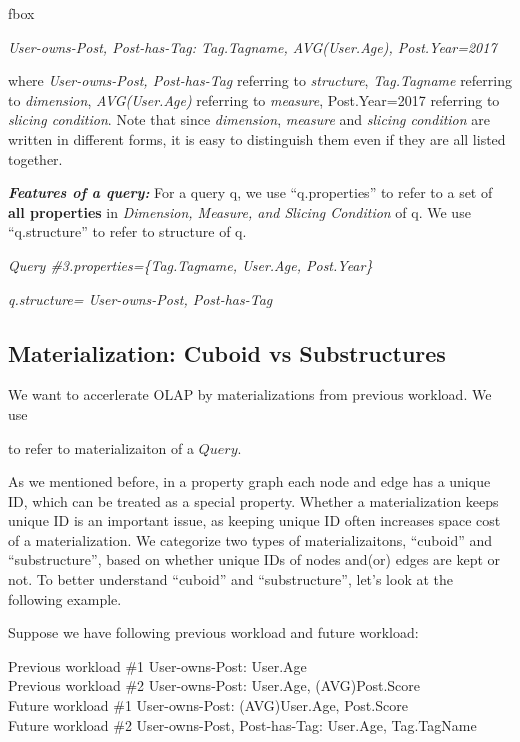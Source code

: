 fbox{
\textit{User-owns-Post, Post-has-Tag: Tag.Tagname, AVG(User.Age), Post.Year=2017
}

where \textit{User-owns-Post, Post-has-Tag} referring to  \textit{structure}, \textit{Tag.Tagname} referring to \textit{dimension},\textit{ AVG(User.Age) } referring to \textit{measure}, {Post.Year=2017} referring to \textit{slicing condition}. Note that since \textit{dimension}, \textit{measure} and \textit{slicing condition} are written in different forms, it is easy to distinguish them even if they are all listed together.


 \textbf{\textit{Features of a query:}} For a query q, we use ``q.properties'' to refer to a set of \textbf{all properties} in \textit{Dimension, Measure, and Slicing Condition} of q. We use ``q.structure'' to refer to structure of q.

 \textit{Query \#3.properties=\{Tag.Tagname, User.Age, Post.Year\}}
 
 \textit{q.structure= User-owns-Post, Post-has-Tag}



\subsection{Materialization: Cuboid vs Substructures}

We want to accerlerate OLAP by materializations from previous workload. We use


to refer to materializaiton of a $Query$.

As we mentioned before, in a property graph each node and edge has a unique ID, which can be treated as a special property. Whether a materialization keeps unique ID is an important issue, as keeping unique ID often increases space cost of a materialization. We categorize two types of materializaitons, ``cuboid'' and ``substructure'', based on whether unique IDs of nodes and(or) edges are kept or not. To better understand ``cuboid'' and ``substructure'', let's look at the following example.


Suppose we have following previous workload and future workload:

Previous workload \#1 User-owns-Post: User.Age\\
Previous workload \#2 User-owns-Post: User.Age, (AVG)Post.Score\\
Future workload \#1 User-owns-Post: (AVG)User.Age, Post.Score	\\
Future workload \#2 User-owns-Post, Post-has-Tag: User.Age, Tag.TagName




}
